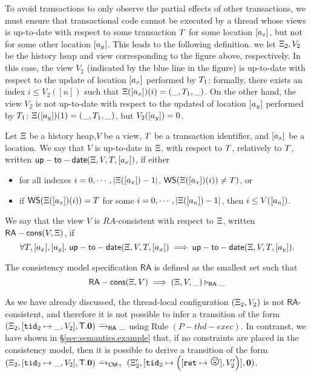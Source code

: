 To avoid transactions to only observe the partial effects of other transactions, we 
must ensure that transactional code cannot be executed by a thread whose 
views is up-to-date with respect to some transaction $T$ for some location $[a_x]$, 
but not for some other location $[a_y]$. This leads to the following definition.
we let $\Xi_2, V_2$ be the history heap and view corresponding to the figure above, respectively. 
In this case, the view $V_2$ (indicated by the blue line in the figure) 
is up-to-date with respect to the update of location $[a_x]$ performed by $T_1$: 
formally, there exists an index $i \leq V_2([n])$ such that $\Xi([a_{x}])(i) = (\_, T_1, \_)$. 
On the other hand, the view $V_2$ is not up-to-date with respect to the updated of 
location $[a_y]$ performed by $T_1$:  $\Xi([a_y])(1) = (\_, T_1, \_)$, 
but $V_2([a_y]) = 0$. 
\begin{definition}
Let $\Xi$ be a history heap,$V$ be a view, $T$ be a transaction identifier, and $[a_x]$ be a location.
We say that $V$ is up-to-date in $\Xi$, with respect to $T$, relatively to $T$, 
written $\mathsf{up-to-date}(\Xi, V, T, [a_x])$, if either 

\begin{itemize}
\item for all indexes $i = 0,\cdots, \lvert \Xi([a_x]) - 1 \rvert$, 
$\mathsf{WS}(\Xi([a_x])(i)) \neq T)$, or 
\item if $\mathsf{WS}(\Xi([a_x])(i)) = T$ for some $i = 0,\cdots, \lvert \Xi([a_n]) -1 \rvert$, 
then $i \leq V([a_n])$.
\end{itemize}

We say that the view $V$ is $RA$-consistent with respect to $\Xi$, written $\mathsf{RA-cons}(V, \Xi)$, if
\[
\forall T, [a_x], [a_y].\; \mathsf{up-to-date}(\Xi, V, T, [a_x]) \implies \mathsf{up-to-date}(\Xi, V, T, [a_y]).
\]

The consistency model specification $\mathsf{RA}$ is defined as the smallest set such that  
\[
\mathsf{RA-cons}(\Xi, V) \implies (\Xi, V, \_) \triangleright_{\mathsf{RA}} \_
\]
\end{definition}

As we have already discussed, the thread-local configuration $(\Xi_2, V_2)$ is not $\mathsf{RA}$-consistent, 
and therefore it is not possible to infer a transition of the form $(\Xi_2, [\mathtt{tid}_2 \mapsto \_, V_2], \mathsf{T}.\mathbf{0} ) \xrightarrow{\_}_{\mathsf{RA}} 
\_$ using Rule $(P-thd-exec)$. In contranst, we have shown in \S \ref{sec:semantics.example} that, if no 
constraints are placed in the consistency model, then it is possible to derive a transition of the form 
$(\Xi_2, [\mathtt{tid}_2 \mapsto \_, V_2], \mathsf{T}.\mathbf{0}) \xrightarrow{\_}_{\mathsf{CM}_{\top}}$ 
$(\hh_2', [\tid_2 \mapsto \left( [\retvar \mapsto {\Large \frownie{}}], V_2' \right) ], \nil)$.

